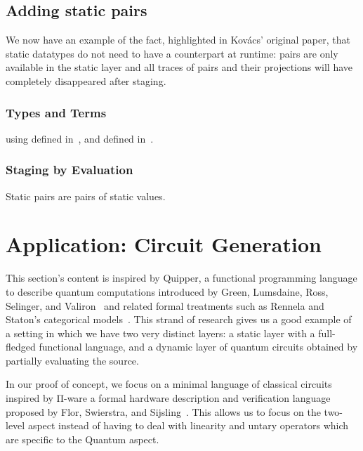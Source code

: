 \documentclass{article}
\begin{document}
\subsection{Adding static pairs}\label{sec:stagingmodelprod}

We now have an example of the fact, highlighted in Kov{\'{a}}cs'
original paper, that static datatypes do not need to have a
counterpart at runtime: pairs are only available in the static
layer and all traces of pairs and their projections will have
completely disappeared after staging.

\subsubsection{Types and Terms}




using  defined in~,
and  defined in~.

\subsubsection{Staging by Evaluation}

Static pairs are pairs of static values.



\section{Application: Circuit Generation}

This section's content is inspired by Quipper, a functional
programming language to describe quantum computations
introduced by Green, Lumsdaine, Ross, Selinger, and
Valiron~\cite{DBLP:conf/rc/GreenLRSV13} and related
formal treatments such as Rennela and Staton's categorical
models~\cite{DBLP:journals/lmcs/RennelaS19}.
%
This strand of research gives us a good example of a setting in which
we have two very distinct layers: a static layer with a
full-fledged functional language, and a dynamic layer of
quantum circuits obtained by partially evaluating the source.

In our proof of concept, we focus on a minimal language of
classical circuits inspired by Π-ware a formal hardware
description and verification language proposed by
Flor, Swierstra, and Sijsling~\cite{DBLP:conf/types/FlorSS15}.
%
This allows us to focus on the two-level aspect instead of
having to deal with linearity and untary operators which are
specific to the Quantum aspect.
\end{document}
